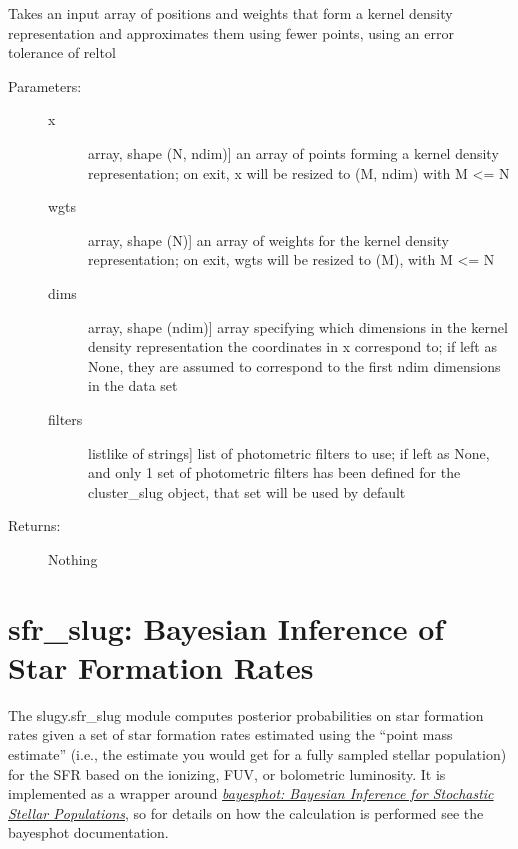 \documentclass[letterpaper,10pt,english]{sphinxmanual}
\begin{document}
\begin{fulllineitems}
\begin{fulllineitems}
\label{cluster_slug:slugpy.cluster_slug.cluster_slug.squeeze_rep}
Takes an input array of positions and weights that form a
kernel density representation and approximates them using
fewer points, using an error tolerance of reltol
\begin{description}
\item[{Parameters:}] \leavevmode\begin{description}
\item[{x}] \leavevmode{[}array, shape (N, ndim){]}
an array of points forming a kernel density
representation; on exit, x will be resized to (M, ndim)
with M \textless{}= N

\item[{wgts}] \leavevmode{[}array, shape (N){]}
an array of weights for the kernel density
representation; on exit, wgts will be resized to (M),
with M \textless{}= N

\item[{dims}] \leavevmode{[}array, shape (ndim){]}
array specifying which dimensions in the kernel density
representation the coordinates in x correspond to; if
left as None, they are assumed to correspond to the
first ndim dimensions in the data set

\item[{filters}] \leavevmode{[}listlike of strings{]}
list of photometric filters to use; if left as None, and
only 1 set of photometric filters has been defined for
the cluster\_slug object, that set will be used by
default

\end{description}

\item[{Returns:}] \leavevmode
Nothing

\end{description}

\end{fulllineitems}


\end{fulllineitems}



\chapter{sfr\_slug: Bayesian Inference of Star Formation Rates}
\label{sfr_slug:sfr-slug-bayesian-inference-of-star-formation-rates}\label{sfr_slug::doc}\label{sfr_slug:sec-sfr-slug}
The slugy.sfr\_slug module computes posterior probabilities on star formation rates given a set of star formation rates estimated using the ``point mass estimate'' (i.e., the estimate you would get for a fully sampled stellar population) for the SFR based on the ionizing, FUV, or bolometric luminosity. It is implemented as a wrapper around {\hyperref[bayesphot:sec\string-bayesphot]{\emph{bayesphot: Bayesian Inference for Stochastic Stellar Populations}}}, so for details on how the calculation is performed see the bayesphot documentation.
\end{document}
